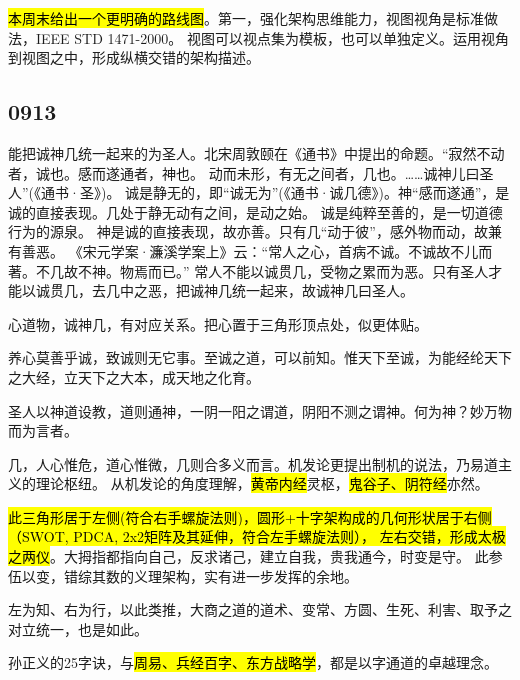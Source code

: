 \hl{本周末给出一个更明确的路线图}。第一，强化架构思维能力，视图视角是标准做法，IEEE STD 1471-2000。
视图可以视点集为模板，也可以单独定义。运用视角到视图之中，形成纵横交错的架构描述。

\subsection{0913}

\begin{shadequote}

能把诚神几统一起来的为圣人。北宋周敦颐在《通书》中提出的命题。“寂然不动者，诚也。感而遂通者，神也。
动而未形，有无之间者，几也。……诚神儿曰圣人”(《通书·圣》)。
诚是静无的，即“诚无为”(《通书·诚几德》)。神“感而遂通”，是诚的直接表现。几处于静无动有之间，是动之始。
诚是纯粹至善的，是一切道德行为的源泉。
神是诚的直接表现，故亦善。只有几“动于彼”，感外物而动，故兼有善恶。
《宋元学案·濂溪学案上》云：“常人之心，首病不诚。不诚故不儿而著。不几故不神。物焉而已。”
常人不能以诚贯几，受物之累而为恶。只有圣人才能以诚贯几，去几中之恶，把诚神几统一起来，故诚神几曰圣人。
\end{shadequote}

心道物，诚神几，有对应关系。把心置于三角形顶点处，似更体贴。

养心莫善乎诚，致诚则无它事。至诚之道，可以前知。惟天下至诚，为能经纶天下之大经，立天下之大本，成天地之化育。

圣人以神道设教，道则通神，一阴一阳之谓道，阴阳不测之谓神。何为神？妙万物而为言者。

几，人心惟危，道心惟微，几则合多义而言。机发论更提出制机的说法，乃易道主义的理论枢纽。
从机发论的角度理解，\hl{黄帝内经}灵枢，\hl{鬼谷子、阴符经}亦然。

\hl{此三角形居于左侧(符合右手螺旋法则)，圆形+十字架构成的几何形状居于右侧（SWOT, PDCA, 2x2矩阵及其延伸，符合左手螺旋法则），
左右交错，形成太极之两仪}。大拇指都指向自己，反求诸己，建立自我，贵我通今，时变是守。
此参伍以变，错综其数的义理架构，实有进一步发挥的余地。

左为知、右为行，以此类推，大商之道的道术、变常、方圆、生死、利害、取予之对立统一，也是如此。

孙正义的25字诀，与\hl{周易、兵经百字、东方战略学}，都是以字通道的卓越理念。
